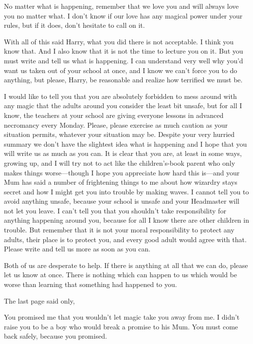 \begin{writtenNote}
No matter what is happening, remember that we love you and will always
love you no matter what. I don't know if our love has any magical power under
your rules, but if it does, don't hesitate to call on it.

With all of this said{\el} Harry, what you did there is not
acceptable. I think you know that. And I also know that it is not the time to
lecture you on it. But you must write and tell us what is happening. I can
understand very well why you'd want us taken out of your school at once, and I
know we can't force you to do anything, but please, Harry, be reasonable and
realize how terrified we must be.

I would like to tell you that you are absolutely forbidden to mess around
with any magic that the adults around you consider the least bit unsafe, but
for all I know, the teachers at your school are giving everyone lessons in
advanced necromancy every Monday. Please, please exercise as much caution as
your situation permits, whatever your situation may be. Despite your very
hurried summary we don't have the slightest idea what is happening and I hope
that you will write us as much as you can. It is clear that you are, at least
in some ways, growing up, and I will try not to act like the
children's-book parent who only makes things worse—though I hope you
appreciate how hard this is—and your Mum has said a number of frightening
things to me about how wizardry stays secret and how I might get
you into trouble by making waves. I cannot tell you to avoid
anything unsafe, because your school is unsafe and your Headmaster will not let
you leave. I can't tell you that you shouldn't take responsibility for anything
happening around you, because for all I know there are other children in
trouble. But remember that it is not your moral responsibility to
protect any adults, their place is to protect you, and every good adult would
agree with that. Please write and tell us more as soon as you can.

Both of us are desperate to help. If there is anything at all that we can
do, please let us know at once. There is nothing which can happen to us which
would be worse than learning that something had happened to you.

\end{writtenNote}

The last page said only,

\begin{writtenNote}
You promised me that you wouldn't let magic take you away from me. I
didn't raise you to be a boy who would break a promise to his Mum. You must
come back safely, because you promised.

\end{writtenNote}


